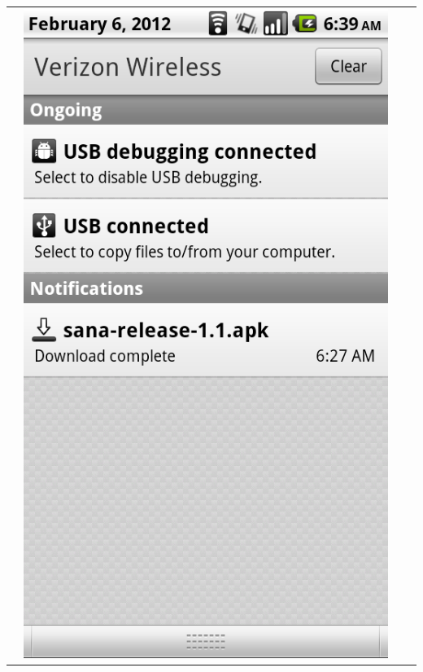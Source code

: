 \documentclass[a4paper,10pt]{article}
\begin{document}
\begin{tabular}{ c c c c }
&\includegraphics[scale=0.2,keepaspectratio=true]{client_download_notification_expanded.png}

\end{tabular}
\end{document}
